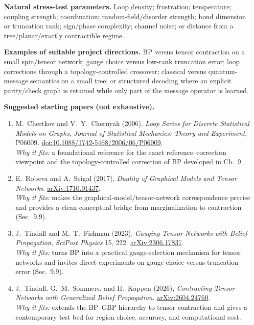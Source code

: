 \documentclass[11pt]{article}
\begin{document}
\textbf{Natural stress-test parameters.} Loop density; frustration; temperature; coupling strength; coordination; random-field/disorder strength; bond dimension or truncation rank; sign/phase complexity; channel noise; or distance from a tree/planar/exactly contractible regime.

\textbf{Examples of suitable project directions.} BP versus tensor contraction on a small spin/tensor network; gauge choice versus low-rank truncation error; loop corrections through a topology-controlled crossover; classical versus quantum-message semantics on a small tree; or structured decoding where an explicit parity/check graph is retained while only part of the message operator is learned.

\textbf{Suggested starting papers (not exhaustive).}
\begin{enumerate}[leftmargin=1.7em,itemsep=5pt]
    \item M.~Chertkov and V.~Y.~Chernyak (2006), \emph{Loop Series for Discrete Statistical Models on Graphs}, \emph{Journal of Statistical Mechanics: Theory and Experiment}, P06009. \href{https://doi.org/10.1088/1742-5468/2006/06/P06009}{doi:10.1088/1742-5468/2006/06/P06009}.\\
    \textcolor{UAgray}{\emph{Why it fits:} a foundational reference for the exact reference--correction viewpoint and the topology-controlled correction of BP developed in Ch.~9.}

    \item E.~Robeva and A.~Seigal (2017), \emph{Duality of Graphical Models and Tensor Networks}. \href{https://arxiv.org/abs/1710.01437}{arXiv:1710.01437}.\\
    \textcolor{UAgray}{\emph{Why it fits:} makes the graphical-model/tensor-network correspondence precise and provides a clean conceptual bridge from marginalization to contraction (Sec.~9.9).}

    \item J.~Tindall and M.~T.~Fishman (2023), \emph{Gauging Tensor Networks with Belief Propagation}, \emph{SciPost Physics} 15, 222. \href{https://arxiv.org/abs/2306.17837}{arXiv:2306.17837}.\\
    \textcolor{UAgray}{\emph{Why it fits:} turns BP into a practical gauge-selection mechanism for tensor networks and invites direct experiments on gauge choice versus truncation error (Sec.~9.9).}

    \item J.~Tindall, G.~M.~Sommers, and H.~Kappen (2026), \emph{Contracting Tensor Networks with Generalized Belief Propagation}. \href{https://arxiv.org/abs/2604.24760}{arXiv:2604.24760}.\\
    \textcolor{UAgray}{\emph{Why it fits:} extends the BP--GBP hierarchy to tensor contraction and gives a contemporary test bed for region choice, accuracy, and computational cost.}


\end{enumerate}
\end{document}
